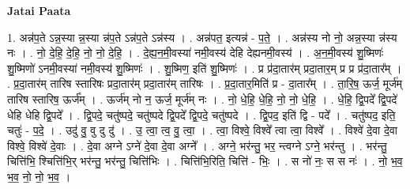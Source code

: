 \documentclass[17pt]{extarticle}
\begin{document}
\textbf{Jatai Paata} \newline

1. अन्न॑प॒ते ऽन्न॒स्या न्न॒स्या न्न॑प॒ते ऽन्न॑प॒ते ऽन्न॑स्य । . अन्न॑पत॒ इत्यन्न॑ - प॒ते॒ । . अन्न॑स्य नो नो॒ अन्न॒स्या न्न॑स्य नः । . नो॒ दे॒हि॒ दे॒हि॒ नो॒ नो॒ दे॒हि॒ । . दे॒ह्य॒न॒मी॒वस्या॑ नमी॒वस्य॑ देहि देह्यनमी॒वस्य॑ । . अ॒न॒मी॒वस्य॑ शु॒ष्मिणः॑ शु॒ष्मिणो॑ ऽनमी॒वस्या॑ नमी॒वस्य॑ शु॒ष्मिणः॑ । . शु॒ष्मिण॒ इति॑ शु॒ष्मिणः॑ । . प्र प्र॑दा॒तार॑म् प्रदा॒तार॒म् प्र प्र प्र॑दा॒तार᳚म् । . प्र॒दा॒तार॑म् तारिष स्तारिषः प्रदा॒तार॑म् प्रदा॒तार॑म् तारिषः । . प्र॒दा॒तार॒मिति॑ प्र - दा॒तार᳚म् । . ता॒रि॒ष॒ ऊर्ज॒ मूर्ज॑म् तारिष स्तारिष॒ ऊर्ज᳚म् । . ऊर्ज॑म् नो न॒ ऊर्ज॒ मूर्ज॑म् नः । . नो॒ धे॒हि॒ धे॒हि॒ नो॒ नो॒ धे॒हि॒ । . धे॒हि॒ द्वि॒पदे᳚ द्वि॒पदे॑ धेहि धेहि द्वि॒पदे᳚ । . द्वि॒पदे॒ चतु॑ष्पदे॒ चतु॑ष्पदे द्वि॒पदे᳚ द्वि॒पदे॒ चतु॑ष्पदे । . द्वि॒पद॒ इति॑ द्वि - पदे᳚ । . चतु॑ष्पद॒ इति॒ चतुः॑ - प॒दे॒ । . उदु॑ वु॒ वु दु दु॑ । . उ॒ त्वा॒ त्व॒ वु॒ त्वा॒ । . त्वा॒ विश्वे॒ विश्वे᳚ त्वा त्वा॒ विश्वे᳚ । . विश्वे॑ दे॒वा दे॒वा विश्वे॒ विश्वे॑ दे॒वाः । . दे॒वा अग्ने ऽग्ने॑ दे॒वा दे॒वा अग्ने᳚ । . अग्ने॒ भर॑न्तु॒ भर॒ न्त्वग्ने ऽग्ने॒ भर॑न्तु । . भर॑न्तु॒ चित्ति॑भि॒ श्चित्ति॑भि॒र् भर॑न्तु॒ भर॑न्तु॒ चित्ति॑भिः । . चित्ति॑भि॒रिति॒ चित्ति॑ - भिः॒ । . स नो॑ नः॒ स स नः॑ । . नो॒ भ॒व॒ भ॒व॒ नो॒ नो॒ भ॒व॒ । \newline
\end{document}
